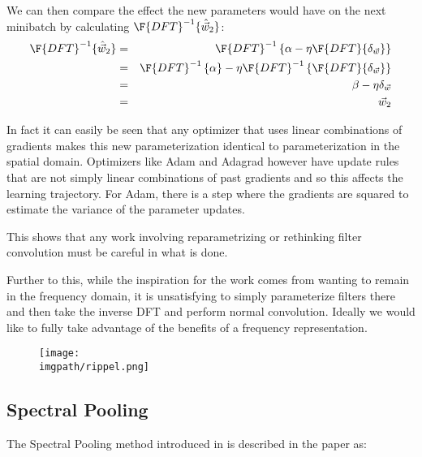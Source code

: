 We can then compare the effect the new parameters would have on the next
minibatch by calculating $\F{DFT}^{-1} \{\hat{\vec{w}}_2 \}$:
\begin{eqnarray*}
  \F{DFT} ^{-1} \{ \hat{\vec{w}}_2 \} &=& \F{DFT} ^{-1} \left\{ \alpha - \eta \F{DFT} \{ \delta_{\vec{w}} \} \right\}  \\
       & = & \F{DFT}^{-1} \left \{ \alpha \right \} - \eta \F{DFT}^{-1} \left \{ \F{DFT} \{ \delta_{\vec{w}} \} \right \} \\
       & = & \beta - \eta \delta_{\vec{w}} \\
       & = & \vec{w}_2
\end{eqnarray*}

In fact it can easily be seen that any optimizer that uses linear combinations
of gradients makes this new parameterization identical to parameterization in
the spatial domain. Optimizers like Adam and Adagrad however have update rules
that are not simply linear combinations of past gradients and so this affects
the learning trajectory. For Adam, there is a step where the gradients are
squared to estimate the variance of the parameter updates. 

This shows that any work involving reparametrizing or rethinking filter
convolution must be careful in what is done.

Further to this, while the inspiration for the work comes from wanting to remain
in the frequency domain, it is unsatisfying to simply parameterize filters there
and then take the inverse DFT and perform normal convolution. Ideally we would
like to fully take advantage of the benefits of a frequency representation.

\begin{figure}
  \centering
  \texttt{[image: \\imgpath/rippel.png]}
  \label{fig:rippel_spectral_figs}
\end{figure}


\subsection{Spectral Pooling}
The Spectral Pooling method introduced in \cite{rippel_spectral_2015} is
described in the paper as:


